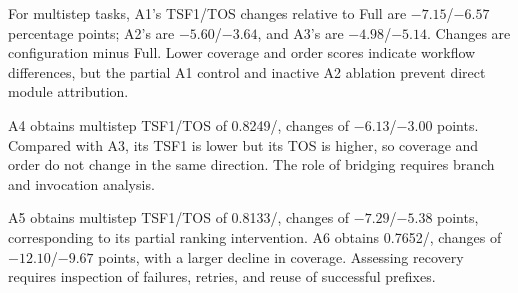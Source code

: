 For multistep tasks, A1's TSF1/TOS changes relative to Full are $-7.15$/\allowbreak $-6.57$ percentage points; A2's are $-5.60$/\allowbreak $-3.64$, and A3's are $-4.98$/\allowbreak $-5.14$. Changes are configuration minus Full. Lower coverage and order scores indicate workflow differences, but the partial A1 control and inactive A2 ablation prevent direct module attribution.

A4 obtains multistep TSF1/TOS of 0.8249/, changes of $-6.13$/\allowbreak $-3.00$ points. Compared with A3, its TSF1 is lower but its TOS is higher, so coverage and order do not change in the same direction. The role of bridging requires branch and invocation analysis.

A5 obtains multistep TSF1/TOS of 0.8133/, changes of $-7.29$/\allowbreak $-5.38$ points, corresponding to its partial ranking intervention. A6 obtains 0.7652/, changes of $-12.10$/\allowbreak $-9.67$ points, with a larger decline in coverage. Assessing recovery requires inspection of failures, retries, and reuse of successful prefixes.

